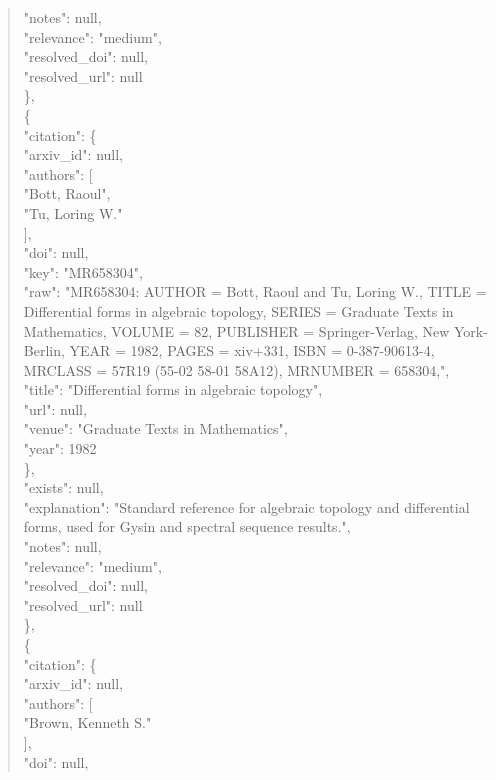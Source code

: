 \documentclass[11pt]{article}
\begin{document}
\begin{quote}
      "notes": null,\\
      "relevance": "medium",\\
      "resolved\_doi": null,\\
      "resolved\_url": null\\
    \},\\
    \{\\
      "citation": \{\\
        "arxiv\_id": null,\\
        "authors": [\\
          "Bott, Raoul",\\
          "Tu, Loring W."\\
        ],\\
        "doi": null,\\
        "key": "MR658304",\\
        "raw": "MR658304: AUTHOR = Bott, Raoul and Tu, Loring W., TITLE = Differential forms in algebraic topology, SERIES = Graduate Texts in Mathematics, VOLUME = 82, PUBLISHER = Springer-Verlag, New York-Berlin, YEAR = 1982, PAGES = xiv+331, ISBN = 0-387-90613-4, MRCLASS = 57R19 (55-02 58-01 58A12), MRNUMBER = 658304,",\\
        "title": "Differential forms in algebraic topology",\\
        "url": null,\\
        "venue": "Graduate Texts in Mathematics",\\
        "year": 1982\\
      \},\\
      "exists": null,\\
      "explanation": "Standard reference for algebraic topology and differential forms, used for Gysin and spectral sequence results.",\\
      "notes": null,\\
      "relevance": "medium",\\
      "resolved\_doi": null,\\
      "resolved\_url": null\\
    \},\\
    \{\\
      "citation": \{\\
        "arxiv\_id": null,\\
        "authors": [\\
          "Brown, Kenneth S."\\
        ],\\
        "doi": null,\\

\end{quote}
\end{document}
